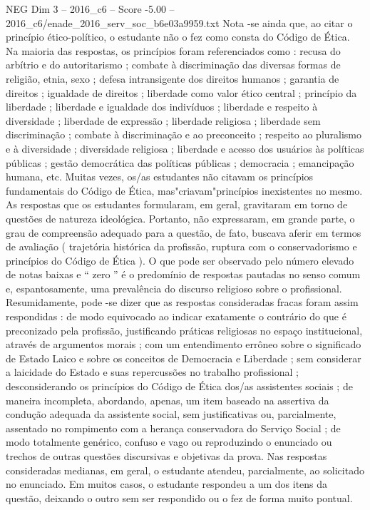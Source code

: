 \begin{textsample}{NEG Dim 3 – 2016\_c6 – Score -5.00 – 2016\_c6/enade\_2016\_serv\_soc\_b6e03a9959.txt}
Nota -se ainda que, ao citar o princípio ético-político, o estudante não o fez como consta do Código de Ética.
Na maioria das respostas, os princípios foram referenciados como : recusa do arbítrio e do autoritarismo ; combate à discriminação das diversas formas de religião, etnia, sexo ; defesa intransigente dos direitos humanos ; garantia de direitos ; igualdade de direitos ; liberdade como valor ético central ; princípio da liberdade ; liberdade e igualdade dos indivíduos ; liberdade e respeito à diversidade ; liberdade de expressão ; liberdade religiosa ; liberdade sem discriminação ; combate à discriminação e ao preconceito ; respeito ao pluralismo e à diversidade ; diversidade religiosa ; liberdade e acesso dos usuários às políticas públicas ; gestão democrática das políticas públicas ; democracia ; emancipação humana, etc.
Muitas vezes, os/as estudantes não citavam os princípios fundamentais do Código de Ética, mas"criavam"princípios inexistentes no mesmo.
As respostas que os estudantes formularam, em geral, gravitaram em torno de questões de natureza ideológica.
Portanto, não expressaram, em grande parte, o grau de compreensão adequado para a questão, de fato, buscava aferir em termos de avaliação ( trajetória histórica da profissão, ruptura com o conservadorismo e princípios do Código de Ética ).
O que pode ser observado pelo número elevado de notas baixas e “ zero ” é o predomínio de respostas pautadas no senso comum e, espantosamente, uma prevalência do discurso religioso sobre o profissional.
Resumidamente, pode -se dizer que as respostas consideradas fracas foram assim respondidas : de modo equivocado ao indicar exatamente o contrário do que é preconizado pela profissão, justificando práticas religiosas no espaço institucional, através de argumentos morais ; com um entendimento errôneo sobre o significado de Estado Laico e sobre os conceitos de Democracia e Liberdade ; sem considerar a laicidade do Estado e suas repercussões no trabalho profissional ; desconsiderando os princípios do Código de Ética dos/as assistentes sociais ; de maneira incompleta, abordando, apenas, um item baseado na assertiva da condução adequada da assistente social, sem justificativas ou, parcialmente, assentado no rompimento com a herança conservadora do Serviço Social ; de modo totalmente genérico, confuso e vago ou reproduzindo o enunciado ou trechos de outras questões discursivas e objetivas da prova.
Nas respostas consideradas medianas, em geral, o estudante atendeu, parcialmente, ao solicitado no enunciado.
Em muitos casos, o estudante respondeu a um dos itens da questão, deixando o outro sem ser respondido ou o fez de forma muito pontual.

\end{textsample}
